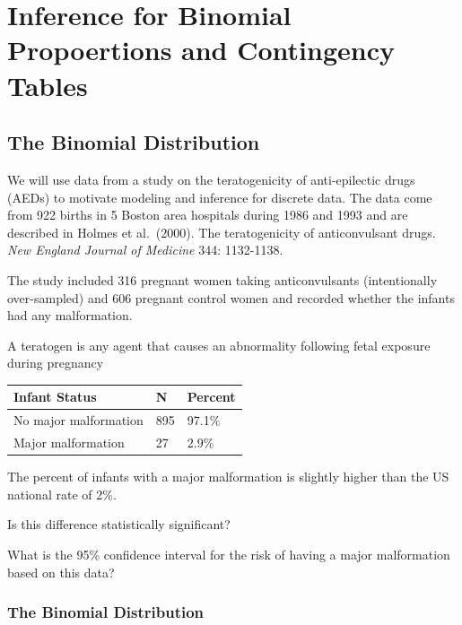 \documentclass[
  letterpaper,
  DIV=11,
  numbers=noendperiod]{scrreport}
\begin{document}

\hypertarget{inference-for-binomial-propoertions-and-contingency-tables}{%
\chapter{Inference for Binomial Propoertions and Contingency
Tables}\label{inference-for-binomial-propoertions-and-contingency-tables}}

\hypertarget{the-binomial-distribution}{%
\section{The Binomial Distribution}\label{the-binomial-distribution}}

We will use data from a study on the teratogenicity of anti-epilectic
drugs (AEDs) to motivate modeling and inference for discrete data. The
data come from 922 births in 5 Boston area hospitals during 1986 and
1993 and are described in Holmes et al.~(2000). The teratogenicity of
anticonvulsant drugs. \emph{New England Journal of Medicine} 344:
1132-1138.

The study included 316 pregnant women taking anticonvulsants
(intentionally over-sampled) and 606 pregnant control women and recorded
whether the infants had any malformation.

A teratogen is any agent that causes an abnormality following fetal
exposure during pregnancy

\begin{longtable}[]{@{}lll@{}}
\toprule()
Infant Status & N & Percent \\
\midrule()
\endhead
No major malformation & 895 & 97.1\% \\
Major malformation & 27 & 2.9\% \\
\bottomrule()
\end{longtable}

The percent of infants with a major malformation is slightly higher than
the US national rate of 2\%.

Is this difference statistically significant?

What is the 95\% confidence interval for the risk of having a major
malformation based on this data?

\hypertarget{the-binomial-distribution-1}{%
\subsection{The Binomial
Distribution}\label{the-binomial-distribution-1}}
\end{document}
